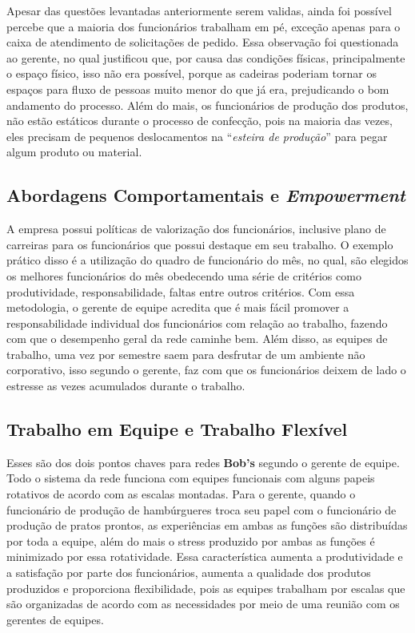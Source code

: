 			Apesar das questões levantadas anteriormente serem validas, ainda foi possível percebe que a maioria dos funcionários trabalham em pé, exceção apenas para o caixa de atendimento de solicitações de pedido. Essa observação foi questionada ao gerente, no qual justificou que, por causa das condições físicas, principalmente o espaço físico, isso não era possível, porque as cadeiras poderiam tornar os espaços para fluxo de pessoas muito menor do que já era, prejudicando o bom andamento do processo. Além do mais, os funcionários de produção dos produtos, não estão estáticos durante o processo de confecção, pois na maioria das vezes, eles precisam de pequenos deslocamentos na “\emph{esteira de produção}” para pegar algum produto ou material.

		\subsection[Abordagens Comportamentais e Empowerment]{Abordagens Comportamentais e \emph{Empowerment}}
		\label{sec:organizacao_ace}

			A empresa possui políticas de valorização dos funcionários, inclusive plano de carreiras para os funcionários que possui destaque em seu trabalho. O exemplo prático disso é a utilização do quadro de funcionário do mês, no qual, são elegidos os melhores funcionários do mês obedecendo uma série de critérios como produtividade, responsabilidade, faltas entre outros critérios. Com essa metodologia, o gerente de equipe acredita que é mais fácil promover a responsabilidade individual dos funcionários com relação ao trabalho, fazendo com que o desempenho geral da rede caminhe bem. Além disso, as equipes de trabalho, uma vez por semestre saem para desfrutar de um ambiente não corporativo, isso segundo o gerente, faz com que os funcionários deixem de lado o estresse as vezes acumulados durante o trabalho. \cite{junior}

		\subsection[Trabalho em Equipe e Trabalho Flexível]{Trabalho em Equipe e Trabalho Flexível}
		\label{sec:tecnologias_tetf}

			Esses são dos dois pontos chaves para redes \textbf{Bob’s} segundo o gerente de equipe. Todo o sistema da rede funciona com equipes funcionais com alguns papeis rotativos de acordo com as escalas montadas. Para o gerente, quando o funcionário de produção de hambúrgueres troca seu papel com o funcionário de produção de pratos prontos, as experiências em ambas as funções são distribuídas por toda a equipe, além do mais o stress produzido por ambas as funções é minimizado por essa rotatividade. Essa característica aumenta a produtividade e a satisfação por parte dos funcionários, aumenta a qualidade dos produtos produzidos e proporciona flexibilidade, pois as equipes trabalham por escalas que são organizadas de acordo com as necessidades por meio de uma reunião com os gerentes de equipes. 
